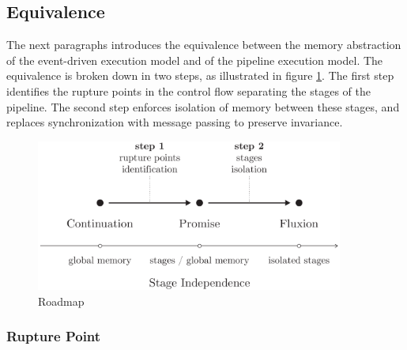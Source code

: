 
\subsection{Equivalence} \label{chapter4:equivalence}

The next paragraphs introduces the equivalence between the memory abstraction of the event-driven execution model and of the pipeline execution model.
The equivalence is broken down in two steps, as illustrated in figure \ref{fig:roadmap}.
The first step identifies the rupture points in the control flow separating the stages of the pipeline.
The second step enforces isolation of memory between these stages, and replaces synchronization with message passing to preserve invariance.

\begin{figure}[h!]
\begin{center}
\includegraphics[width=0.9\textwidth]{../resources/roadmap.pdf}
\end{center}
\caption{Roadmap}
\label{fig:roadmap}
\end{figure}

\subsubsection{Rupture Point}

